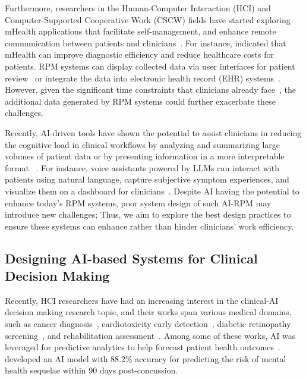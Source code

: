  Furthermore, researchers in the Human-Computer Interaction (HCI) and Computer-Supported Cooperative Work (CSCW) fields have started exploring mHealth applications that facilitate self-management, and enhance remote communication between patients and clinicians~\cite{corwin2024using, nyapathy2019tracking, salamah2021improving, west2018common}. For instance, \citet{el2021mobile} indicated that mHealth can improve diagnostic efficiency and reduce healthcare costs for patients. RPM systems can display collected data via user interfaces for patient review~\cite{griggs2018healthcare} or integrate the data into electronic health record (EHR) systems~\cite{dinh2019wearable}. However, given the significant time constraints that clinicians already face~\cite{haikio2020expectations}, the additional data generated by RPM systems could further exacerbate these challenges. 

 
 Recently, AI-driven tools have shown the potential to assist clinicians in reducing the cognitive load in clinical workflows by analyzing and summarizing large volumes of patient data or by presenting information in a more interpretable format ~\cite{haikio2020expectations}. 
 For instance, voice assistants powered by LLMs can interact with patients using natural language, capture subjective symptom experiences, and visualize them on a dashboard for clinicians~\cite{yang2024talk2care}. 
 Despite AI having the potential to enhance today's RPM systems, poor system design of such AI-RPM may introduce new challenges; 
 Thus, we aim to explore the best design practices to ensure these systems can enhance rather than hinder clinicians' work efficiency.


 

\subsection{Designing AI-based Systems for Clinical Decision Making} 
Recently, HCI researchers have had an increasing interest in the clinical-AI decision making research topic, and their works span various medical domains, such as cancer diagnosis~\cite{cai2019hello,cai2019human,denekamp2007clinical}, cardiotoxicity early detection~\cite{ahmed2024advancements}, diabetic retinopathy screening~\cite{beede2020human}, and rehabilitation assessment~\cite{lee2021human,lee2020co}.
Among some of these works, AI was leveraged for predictive analytics to help forecast patient health outcomes~\cite{zhang2024rethinking, pathak2024comparative, collins2019reporting}. \citet{dabek2022evaluation} 
developed an AI model with 88.2\% accuracy for predicting the risk of mental health sequelae within 90 days post-concussion.


